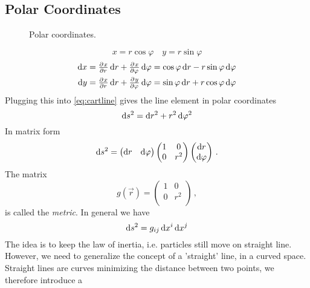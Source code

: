 \subsection*{Polar Coordinates}
\begin{figure}[htb]
    \begin{center}
    \end{center}
    \caption{Polar coordinates.}
\end{figure}
\begin{equation}
    x= r\cos\varphi\quad y= r\sin\varphi
\end{equation}
\begin{align}
    \dif x&= \pd{x}{r}\dif r+\pd{x}{\varphi}\dif \varphi = \cos\varphi\dif r-r\sin\varphi\dif \varphi\\
    \dif y&= \pd{x}{r}\dif r+\pd{y}{\varphi}\dif \varphi = \sin\varphi\dif r+r\cos\varphi\dif \varphi
\end{align}
Plugging this into \eqref{eq:cartline} gives the line element in polar coordinates
\begin{equation}
    \dif s^2=\dif r^2+r^2\dif \varphi^2
\end{equation}
In matrix form
\begin{equation}
    \dif s^2=
    \begin{pmatrix}
        \dif r& \dif \varphi
    \end{pmatrix}
    \begin{pmatrix}
        1& 0\\
        0& r^2\\
    \end{pmatrix}
    \begin{pmatrix}
        \dif r\\ \dif \varphi
    \end{pmatrix}\, .
\end{equation}
The matrix
\begin{equation}
    g(\vec{r})=
    \begin{pmatrix}
        1& 0\\
        0& r^2\\
    \end{pmatrix}\, ,
\end{equation}
is called the \emph{metric}.
In general we have
\begin{equation}
    \dif s^2 = g_{ij}\dif x^i\dif x^j
\end{equation}
The idea is to keep the law of inertia, i.e. particles still move on straight
line. However, we need to generalize the concept of a 'straight' line, in a
curved space.
Straight lines are curves minimizing the distance between two points, we therefore introduce a
